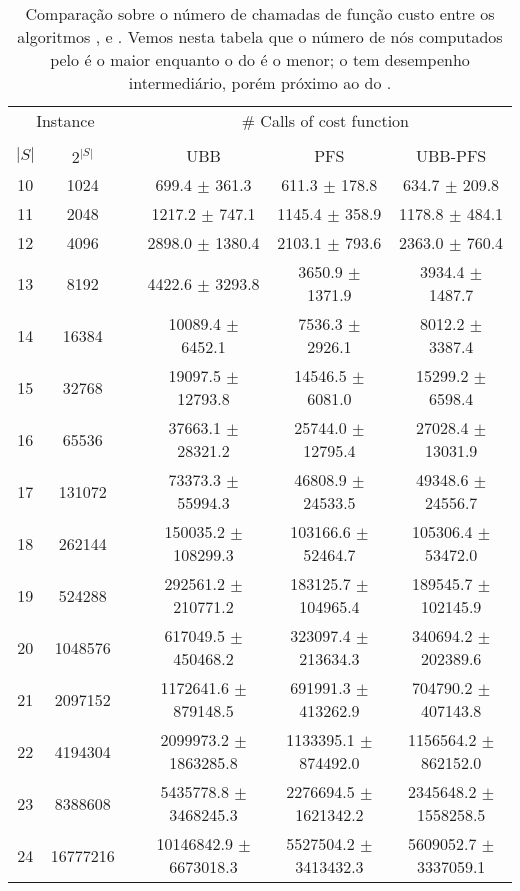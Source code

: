 \begin{table}
\centering
\footnotesize
\begin{tabular}{cc c ccc}
\toprule
\multicolumn{2}{c}{Instance} & \phantom{} & \multicolumn{3}{c}{\# Calls of cost function}\\
\cline{1-2}\cline{4-6} \\
$|S|$ & $2^{|S|}$ && UBB & PFS & UBB-PFS  \\
10 &    1024  && 699.4 $\pm$ 361.3 & 611.3 $\pm$ 178.8 & 634.7 $\pm$ 209.8 \\
11 &    2048  && 1217.2 $\pm$ 747.1 & 1145.4 $\pm$ 358.9 & 1178.8 $\pm$ 484.1 \\
12 &    4096  && 2898.0 $\pm$ 1380.4 & 2103.1 $\pm$ 793.6 & 2363.0 $\pm$ 760.4 \\
13 &    8192  && 4422.6 $\pm$ 3293.8 & 3650.9 $\pm$ 1371.9 & 3934.4 $\pm$ 1487.7 \\
14 &   16384  && 10089.4 $\pm$ 6452.1 & 7536.3 $\pm$ 2926.1 & 8012.2 $\pm$ 3387.4 \\
15 &   32768  && 19097.5 $\pm$ 12793.8 & 14546.5 $\pm$ 6081.0 & 15299.2 $\pm$ 6598.4 \\
16 &   65536  && 37663.1 $\pm$ 28321.2 & 25744.0 $\pm$ 12795.4 & 27028.4 $\pm$ 13031.9 \\
17 &  131072  && 73373.3 $\pm$ 55994.3 & 46808.9 $\pm$ 24533.5 & 49348.6 $\pm$ 24556.7 \\
18 &  262144  && 150035.2 $\pm$ 108299.3 & 103166.6 $\pm$ 52464.7 & 105306.4 $\pm$ 53472.0 \\
19 &  524288  && 292561.2 $\pm$ 210771.2 & 183125.7 $\pm$ 104965.4 & 189545.7 $\pm$ 102145.9 \\
20 & 1048576  && 617049.5 $\pm$ 450468.2 & 323097.4 $\pm$ 213634.3 & 340694.2 $\pm$ 202389.6 \\
21 & 2097152  && 1172641.6 $\pm$ 879148.5 & 691991.3 $\pm$ 413262.9 & 704790.2 $\pm$ 407143.8 \\
22 & 4194304  && 2099973.2 $\pm$ 1863285.8 & 1133395.1 $\pm$ 874492.0 & 1156564.2 $\pm$ 862152.0 \\
23 & 8388608  && 5435778.8 $\pm$ 3468245.3 & 2276694.5 $\pm$ 1621342.2 & 2345648.2 $\pm$ 1558258.5 \\
24 & 16777216 && 10146842.9 $\pm$ 6673018.3 & 5527504.2 $\pm$ 3413432.3 & 5609052.7 $\pm$ 3337059.1 \\
\end{tabular}
\caption{Comparação sobre o número de chamadas de função custo entre
os algoritmos ,  e . Vemos
nesta tabela que o número de nós computados pelo  é o maior
enquanto o do  é o menor; o  tem 
desempenho intermediário, porém próximo ao do .}
\label{tab:ubbpfs_vs_ubb_vs_pfs_computed_nodes}
\end{table}
